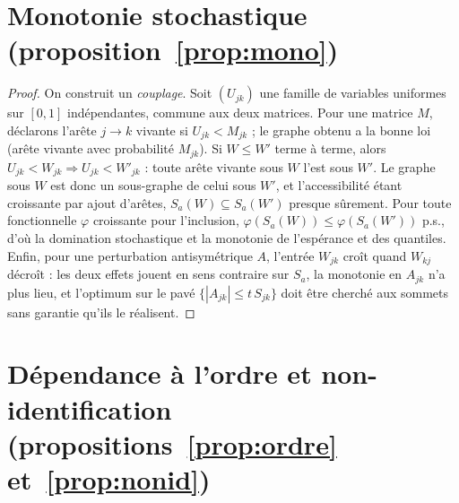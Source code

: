 \section*{Monotonie stochastique (proposition~\ref{prop:mono})}

\begin{proof}
On construit un \emph{couplage}. Soit $(U_{jk})$ une famille de variables uniformes sur $[0,1]$
indépendantes, commune aux deux matrices. Pour une matrice $M$, déclarons l'arête $j\to k$
vivante si $U_{jk}<M_{jk}$ ; le graphe obtenu a la bonne loi (arête vivante avec probabilité
$M_{jk}$). Si $W\le W'$ terme à terme, alors $U_{jk}<W_{jk}\Rightarrow U_{jk}<W'_{jk}$ : toute
arête vivante sous $W$ l'est sous $W'$. Le graphe sous $W$ est donc un sous-graphe de celui sous
$W'$, et l'accessibilité étant croissante par ajout d'arêtes, $S_a(W)\subseteq S_a(W')$ presque
sûrement. Pour toute fonctionnelle $\varphi$ croissante pour l'inclusion,
$\varphi(S_a(W))\le\varphi(S_a(W'))$ p.s., d'où la domination stochastique et la monotonie de
l'espérance et des quantiles. Enfin, pour une perturbation antisymétrique $A$, l'entrée $W_{jk}$
croît quand $W_{kj}$ décroît : les deux effets jouent en sens contraire sur $S_a$, la monotonie
en $A_{jk}$ n'a plus lieu, et l'optimum sur le pavé $\{|A_{jk}|\le t\,S_{jk}\}$ doit être
cherché aux sommets sans garantie qu'ils le réalisent.
\end{proof}

\section*{Dépendance à l'ordre et non-identification (propositions~\ref{prop:ordre} et~\ref{prop:nonid})}

